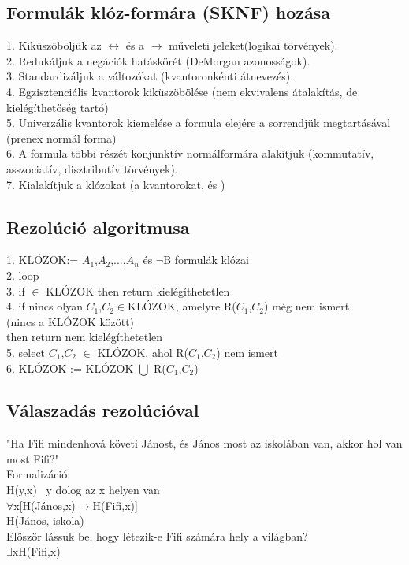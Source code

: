 \documentclass{article}
\begin{document}
	 \newpage
	 \subsection{Formulák klóz-formára (SKNF) hozása}
	 1. Kiküszöböljük az $\leftrightarrow$ és a $\rightarrow$ műveleti jeleket(logikai törvények).\\
	 2. Redukáljuk a negációk hatáskörét (DeMorgan azonosságok).\\
	 3. Standardizáljuk a változókat (kvantoronkénti átnevezés).\\
	 4. Egzisztenciális kvantorok kiküszöbölése (nem ekvivalens átalakítás, de kielégíthetőség tartó)\\
	 5. Univerzális kvantorok kiemelése a formula elejére a sorrendjük megtartásával (prenex normál forma)\\
	 6. A formula többi részét konjunktív normálformára alakítjuk (kommutatív, asszociatív, disztributív törvények).\\
	 7. Kialakítjuk a klózokat (a kvantorokat, és )
	 
	 \subsection{Rezolúció algoritmusa}
	 1. KLÓZOK:= $A_1$,$A_2$,...,$A_n$ és $\neg$B formulák klózai\\
	 2. loop\\
	 3. \hspace{1em} if \fbox{} $\in$ KLÓZOK then return kielégíthetetlen\\
	 4. if nincs olyan $C_1$,$C_2$$\in$KLÓZOK, amelyre R($C_1$,$C_2$) még nem ismert \\
	 \hspace*{5em}(nincs a KLÓZOK között)\\
	 \hspace*{1em} then return nem kielégíthetetlen\\
	 5. select $C_1$,$C_2$ $\in$ KLÓZOK, ahol R($C_1$,$C_2$) nem ismert\\
	 6. KLÓZOK := KLÓZOK $\bigcup$ R($C_1$,$C_2$)
	 
	 \subsection{Válaszadás rezolúcióval}
	 "Ha Fifi mindenhová követi Jánost, és János most az iskolában van, akkor hol van most Fifi?"\\
	 Formalizáció:\\
	 H(y,x) ~y dolog az x helyen van\\
	 $\forall$x[H(János,x)$\rightarrow$H(Fifi,x)]\\
	 H(János, iskola)\\
	 Először lássuk be, hogy létezik-e Fifi számára hely a világban?\\
	 $\exists$xH(Fifi,x)\\
	 
\end{document}

